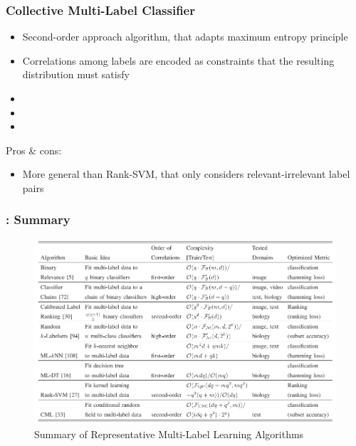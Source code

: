 \documentclass{beamer}
\begin{document}
\begin{frame}
\frametitle{Collective Multi-Label Classifier}
\begin{itemize}
	\item Second-order approach algorithm, that adapts maximum entropy
principle \item Correlations
among labels are encoded as constraints that the resulting
	distribution must satisfy
	\item 
	\item 
	\item 
\end{itemize}
Pros \& cons:
\begin{itemize}
	\item More general than Rank-SVM, that only considers relevant-irrelevant label pairs
\end{itemize}
\end{frame}
\begin{frame}
\frametitle{\insertsection : Summary}
\begin{figure}
	\begin{center}
		\includegraphics[scale = 0.45]{images/summary.png}
		\caption{Summary of Representative Multi-Label Learning Algorithms}
	\end{center}
\end{figure}
\end{frame}
\end{document}
